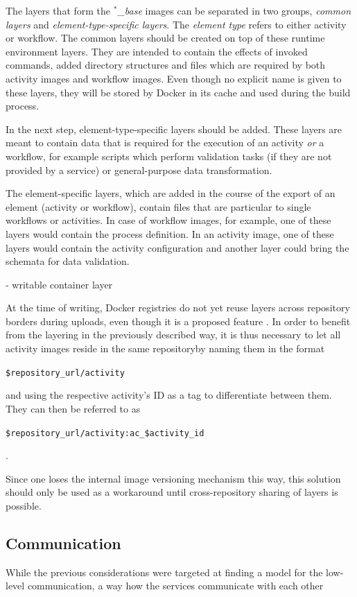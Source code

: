  The layers that form the \emph{$^*$\_base} images can be separated in two groups, \emph{common layers} and \emph{element-type-specific layers}. The \emph{element type} refers to either activity or workflow.
  The common layers should be created on top of these runtime environment layers. They are intended to contain the effects of invoked commands, added directory structures and files which are required by both activity images and workflow images. Even though no explicit name is given to these layers, they will be stored by Docker in its cache and used during the build process.

  In the next step, element-type-specific layers should be added. These layers are meant to contain data that is required for the execution of an activity \emph{or} a workflow, for example scripts which perform validation tasks (if they are not provided by a service) or general-purpose data transformation.

  The element-specific layers, which are added in the course of the export of an element (activity or workflow), contain files that are particular to single workflows or activities. In case of workflow images, for example, one of these layers would contain the process definition. In an activity image, one of these layers would contain the activity configuration and another layer could bring the schemata for data validation.

  - writable container layer

  At the time of writing, Docker registries do not yet reuse layers across repository borders during uploads, even though it is a proposed feature \cite{Mcgowan2015Proposal}. In order to benefit from the layering in the previously described way, it is thus necessary to let all activity images reside in the same repositoryby naming them in the format

  \centerline{\texttt{\$repository\_url/activity}}

  and using the respective activity's \ac{ID} as a tag to differentiate between them. They can then be referred to as

  \centerline{\texttt{\$repository\_url/activity:ac\_\$activity\_id}}.

  Since one loses the internal image versioning mechanism this way, this solution should only be used as a workaround until cross-repository sharing of layers is possible.


\subsection{Communication} %
  \label{sub:application_level_communication}
  While the previous considerations were targeted at finding a model for the low-level communication, a way how the services communicate with each other

